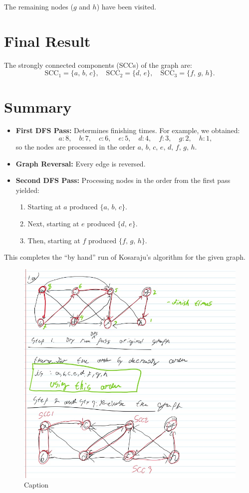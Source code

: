 \documentclass{article}
\begin{document}
The remaining nodes (\(g\) and \(h\)) have been visited.

\section*{Final Result}
The strongly connected components (SCCs) of the graph are:
\[
\text{SCC}_1 = \{a,\, b,\, c\},\quad \text{SCC}_2 = \{d,\, e\},\quad \text{SCC}_3 = \{f,\, g,\, h\}.
\]

\section*{Summary}
\begin{itemize}
    \item \textbf{First DFS Pass:} Determines finishing times. For example, we obtained:
    \[
    a: 8,\quad b: 7,\quad c: 6,\quad e: 5,\quad d: 4,\quad f: 3,\quad g: 2,\quad h: 1,
    \]
    so the nodes are processed in the order \(a,\, b,\, c,\, e,\, d,\, f,\, g,\, h\).
    \item \textbf{Graph Reversal:} Every edge is reversed.
    \item \textbf{Second DFS Pass:} Processing nodes in the order from the first pass yielded:
    \begin{enumerate}
        \item Starting at \(a\) produced \(\{a,\, b,\, c\}\).
        \item Next, starting at \(e\) produced \(\{d,\, e\}\).
        \item Then, starting at \(f\) produced \(\{f,\, g,\, h\}\).
    \end{enumerate}
\end{itemize}

This completes the “by hand” run of Kosaraju’s algorithm for the given graph.


\begin{figure}
    \centering
    \includegraphics[width=0.5\linewidth]{figures/problemset4_fig_1.jpg}
    \caption{Caption}
    \label{fig:enter-label}
\end{figure}
\end{document}
